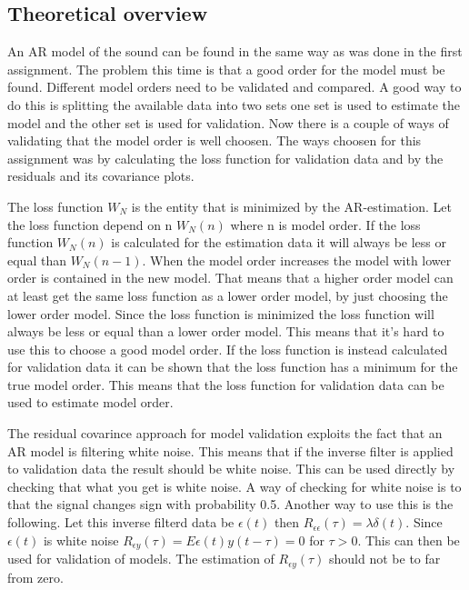 \documentclass[12pt]{article}
\begin{document}
\subsection{Theoretical overview}
An AR model of the sound can be found in the same way as was done in the first assignment.
The problem this time is that a good order for the model must be found.
Different model orders need to be validated and compared.
A good way to do this is splitting the available data into two sets one set is used to estimate the model and the other set is used for validation.
Now there is a couple of ways of validating that the model order is well choosen.
The ways choosen for this assignment was by calculating the loss function for validation data and by the residuals and its covariance plots.

The loss function $W_N$ is the entity that is minimized by the AR-estimation.
Let the loss function depend on n $W_N(n)$ where n is model order.
If the loss function $W_N(n)$ is calculated for the estimation data it will always be less or equal than $W_N(n-1)$.
When the model order increases the model with lower order is contained in the new model.
That means that a higher order model can at least get the same loss function as a lower order model, by just choosing the lower order model.
Since the loss function is minimized the loss function will always be less or equal than a lower order model.
This means that it's hard to use this to choose a good model order.
If the loss function is instead calculated for validation data it can be shown that the loss function has a minimum for the true model order.
This means that the loss function for validation data can be used to estimate model order.

The residual covarince approach for model validation exploits the fact that an AR model is filtering white noise.
This means that if the inverse filter is applied to validation data the result should be white noise.
This can be used directly by checking that what you get is white noise.
A way of checking for white noise is to that the signal changes sign with probability 0.5.
Another way to use this is the following.
Let this inverse filterd data be $\epsilon(t)$ then $R_{\epsilon \epsilon}(\tau) = \lambda\delta(t)$.
Since $\epsilon(t)$ is white noise $R_{\epsilon y}(\tau) = E\epsilon(t) y(t-\tau) = 0$ for $\tau > 0$.
This can then be used for validation of models.
The estimation of $R_{\epsilon y}(\tau)$ should not be to far from zero.
\end{document}
